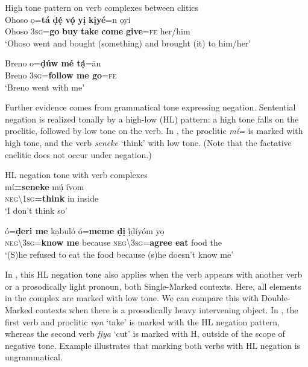 \documentclass[output=paper]{langsci/langscibook}
\begin{document}
\ea\label{ex:rolle:ht}
{High tone pattern on verb complexes between clitics} \\
\ea\label{ex:rolle:50}
\gll   Ohoso   ọ=\textbf{tá}  \textbf{ḍẹ́ } \textbf{vọ́  } \textbf{ yị } \textbf{kịyé}=n   ọyi\\
     Ohoso    \textsc{3sg}=\textbf{go}  \textbf{buy}  \textbf{take}  \textbf{come}  \textbf{give}=\textsc{fe}   her/him\\
\glt ‘Ohoso went and bought (something) and brought (it) to him/her’ \citep[121]{Kari2004}

\ex\label{ex:rolle:51}
\gll   Breno   o=\textbf{ḍúw    mé   tạ́}=ān\\
     Breno   3\textsc{sg}=\textbf{follow  me   go}=\textsc{fe}\\
\glt ‘Breno went with me’ \citep[115]{Kari2004}
\z
\z 

Further evidence comes from grammatical tone expressing negation. Sentential negation is realized tonally by a high-low (HL) pattern: a high tone falls on the proclitic, followed by low tone on the verb. In , the proclitic \textit{mí=} is marked with high tone, and the verb \textit{seneke} ‘think’ with low tone. (Note that the factative enclitic does not occur under negation.)

\ea\label{ex:rolle:hl}
{HL negation tone with verb complexes} \\
   \ea\label{ex:rolle:52}
\gll   mí\textbf{=seneke}      mụ́   ívom\\
     \textsc{neg{\textbackslash}1sg}\textbf{=think}    in   inside\\
\glt ‘I don’t think so’ \citep[32]{Kari2004}

\ex\label{ex:rolle:53}
\gll   ó=\textbf{ḍeri       me}   kạbuló   ó=\textbf{meme     ḍị}   ị́ḍíyóm   yọ\\
     \textsc{neg{\textbackslash}3sg}=\textbf{know  me}    because   \textsc{neg{\textbackslash}3sg}=\textbf{agree   eat}   food   the\\
\glt ‘(S)he refused to eat the food because (s)he doesn’t know me’ \citep[45]{Kari2004}  
\z
\z 

In , this HL negation tone also applies when the verb appears with another verb or a prosodically light pronoun, both Single-Marked contexts. Here, all elements in the complex are marked with low tone. We can compare this with Double-Marked contexts when there is a prosodically heavy intervening object. In , the first verb and proclitic \textit{vọn} ‘take’ is marked with the HL negation pattern, whereas the second verb \textit{fịya} ‘cut’ is marked with H, outside of the scope of negative tone. Example  illustrates that marking both verbs with HL negation is ungrammatical. 
\end{document}
